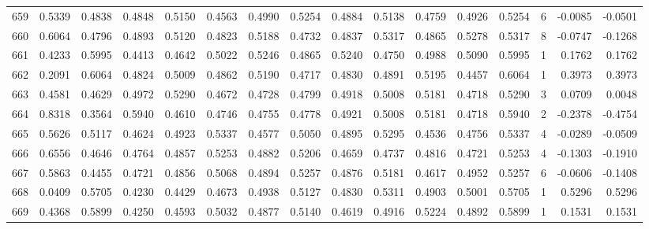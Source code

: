 \begin{tabular}{lrrrrrrrrrrrrrrr}
659 &      0.5339 &  0.4838 &  0.4848 &  0.5150 &  0.4563 &  0.4990 &  0.5254 &  0.4884 &  0.5138 &  0.4759 &   0.4926 &     0.5254 &      6 &                   -0.0085 &                    -0.0501 \\
660 &      0.6064 &  0.4796 &  0.4893 &  0.5120 &  0.4823 &  0.5188 &  0.4732 &  0.4837 &  0.5317 &  0.4865 &   0.5278 &     0.5317 &      8 &                   -0.0747 &                    -0.1268 \\
661 &      0.4233 &  0.5995 &  0.4413 &  0.4642 &  0.5022 &  0.5246 &  0.4865 &  0.5240 &  0.4750 &  0.4988 &   0.5090 &     0.5995 &      1 &                    0.1762 &                     0.1762 \\
662 &      0.2091 &  0.6064 &  0.4824 &  0.5009 &  0.4862 &  0.5190 &  0.4717 &  0.4830 &  0.4891 &  0.5195 &   0.4457 &     0.6064 &      1 &                    0.3973 &                     0.3973 \\
663 &      0.4581 &  0.4629 &  0.4972 &  0.5290 &  0.4672 &  0.4728 &  0.4799 &  0.4918 &  0.5008 &  0.5181 &   0.4718 &     0.5290 &      3 &                    0.0709 &                     0.0048 \\
664 &      0.8318 &  0.3564 &  0.5940 &  0.4610 &  0.4746 &  0.4755 &  0.4778 &  0.4921 &  0.5008 &  0.5181 &   0.4718 &     0.5940 &      2 &                   -0.2378 &                    -0.4754 \\
665 &      0.5626 &  0.5117 &  0.4624 &  0.4923 &  0.5337 &  0.4577 &  0.5050 &  0.4895 &  0.5295 &  0.4536 &   0.4756 &     0.5337 &      4 &                   -0.0289 &                    -0.0509 \\
666 &      0.6556 &  0.4646 &  0.4764 &  0.4857 &  0.5253 &  0.4882 &  0.5206 &  0.4659 &  0.4737 &  0.4816 &   0.4721 &     0.5253 &      4 &                   -0.1303 &                    -0.1910 \\
667 &      0.5863 &  0.4455 &  0.4721 &  0.4856 &  0.5068 &  0.4894 &  0.5257 &  0.4876 &  0.5181 &  0.4617 &   0.4952 &     0.5257 &      6 &                   -0.0606 &                    -0.1408 \\
668 &      0.0409 &  0.5705 &  0.4230 &  0.4429 &  0.4673 &  0.4938 &  0.5127 &  0.4830 &  0.5311 &  0.4903 &   0.5001 &     0.5705 &      1 &                    0.5296 &                     0.5296 \\
669 &      0.4368 &  0.5899 &  0.4250 &  0.4593 &  0.5032 &  0.4877 &  0.5140 &  0.4619 &  0.4916 &  0.5224 &   0.4892 &     0.5899 &      1 &                    0.1531 &                     0.1531 \\

\end{tabular}
